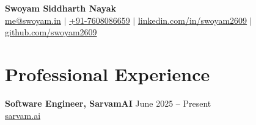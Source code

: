 \documentclass[a4paper,9pt]{extarticle}
\begin{document}
\begin{center}
    {\LARGE \textbf{Swoyam Siddharth Nayak}}\\[4pt]
    \href{mailto:me@swoyam.in}{me@swoyam.in} $\vert$
    \href{https://api.whatsapp.com/send?phone=917608086659}{+91-7608086659} $\vert$
    \href{https://www.linkedin.com/in/swoyam2609/}{linkedin.com/in/swoyam2609} $\vert$
    \href{https://github.com/swoyam2609}{github.com/swoyam2609}
\end{center}

\section*{Professional Experience}
\textbf{Software Engineer, SarvamAI} \hfill June 2025 -- Present\\
\href{https://www.sarvam.ai/}{sarvam.ai}
\end{document}
